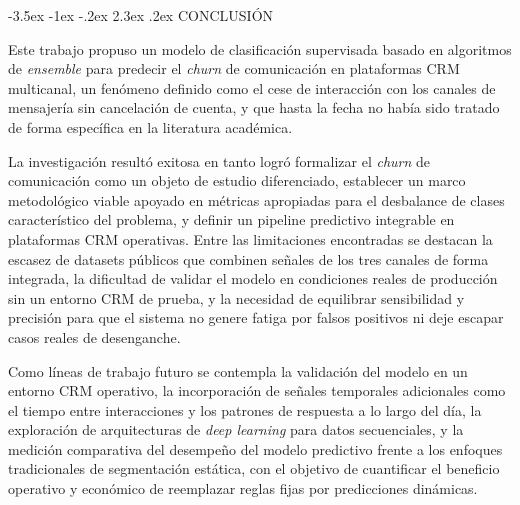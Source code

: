 \documentclass[11pt,a4paper]{article}
\makeatletter
\renewcommand\section{\@startsection{section}{1}{\z@}%
  {-3.5ex \@plus -1ex \@minus -.2ex}%
  {2.3ex \@plus.2ex}%
  {\normalfont\normalsize\centering}}
\makeatother
\begin{document}
\section{CONCLUSIÓN}

Este trabajo propuso un modelo de clasificación supervisada basado en
algoritmos de \textit{ensemble} para predecir el \textit{churn} de
comunicación en plataformas CRM multicanal, un fenómeno definido como
el cese de interacción con los canales de mensajería sin cancelación
de cuenta, y que hasta la fecha no había sido tratado de forma
específica en la literatura académica.

La investigación resultó exitosa en tanto logró formalizar el
\textit{churn} de comunicación como un objeto de estudio diferenciado,
establecer un marco metodológico viable apoyado en métricas apropiadas
para el desbalance de clases característico del problema, y definir un
pipeline predictivo integrable en plataformas CRM operativas. Entre
las limitaciones encontradas se destacan la escasez de datasets
públicos que combinen señales de los tres canales de forma integrada,
la dificultad de validar el modelo en condiciones reales de producción
sin un entorno CRM de prueba, y la necesidad de equilibrar sensibilidad
y precisión para que el sistema no genere fatiga por falsos positivos
ni deje escapar casos reales de desenganche.

Como líneas de trabajo futuro se contempla la validación del modelo en
un entorno CRM operativo, la incorporación de señales temporales
adicionales como el tiempo entre interacciones y los patrones de
respuesta a lo largo del día, la exploración de arquitecturas de
\textit{deep learning} para datos secuenciales, y la medición
comparativa del desempeño del modelo predictivo frente a los enfoques
tradicionales de segmentación estática, con el objetivo de cuantificar
el beneficio operativo y económico de reemplazar reglas fijas por
predicciones dinámicas.



\end{document}
